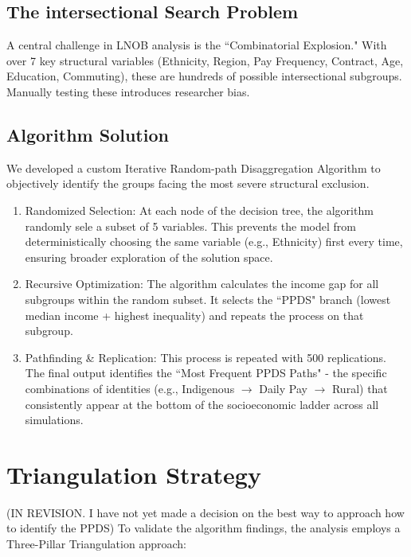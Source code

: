 \documentclass{article}
\begin{document}
\subsection{The intersectional Search Problem}
A central challenge in LNOB analysis is the ``Combinatorial Explosion." With over 7 key structural 
variables (Ethnicity, Region, Pay Frequency, Contract, Age, Education, Commuting), these are 
hundreds of possible intersectional subgroups. Manually testing these introduces researcher bias. 

\subsection{Algorithm Solution}
We developed a custom Iterative Random-path Disaggregation Algorithm to objectively identify 
the groups facing the most severe structural exclusion. 
\begin{enumerate}

    \item Randomized Selection: At each node of the 
    decision tree, the algorithm randomly sele
    a subset of 5 variables. This prevents the 
    model from deterministically choosing the 
    same variable (e.g., Ethnicity) first every 
    time, ensuring broader exploration of the 
    solution space. 

    \item Recursive Optimization: The algorithm 
    calculates the income gap for all subgroups 
    within the random subset. It selects the ``PPDS" 
    branch (lowest median income + highest inequality) 
    and repeats the process on that subgroup. 

    \item Pathfinding \& Replication: This process 
    is repeated with 500 replications. The final 
    output identifies the ``Most Frequent PPDS Paths" 
    - the specific combinations of identities (e.g., 
    Indigenous $\to$ Daily Pay $\to$ Rural) that 
    consistently appear at the bottom of the 
    socioeconomic ladder across all simulations. 

\end{enumerate}
\section{Triangulation Strategy} (IN REVISION. I have not yet made a decision on the best way 
to approach how to identify the PPDS)
To validate the algorithm findings, the analysis employs a Three-Pillar Triangulation approach: 
\end{document}
